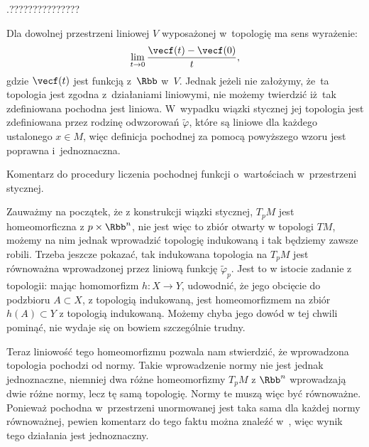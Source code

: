 \documentclass[a4paper,11pt]{article}
\numberwithin{equation}{section}
\begin{document}
\vspace{\spaceFour}





\noindent
{} .???????????????

\vspace{\spaceFour}





\noindent
{} Dla dowolnej przestrzeni liniowej $V$ wyposażonej w~topologię
ma sens wyrażenie:
\begin{equation}
  \label{eq:GancarzewiczZWGR-s01-02}
  \lim\limits_{ t \to 0 } \frac{ \vecf( t ) - \vecf( 0 ) }{ t },
\end{equation}
gdzie $\vecf( t )$ jest funkcją z~$\Rbb$ w~$V$. Jednak jeżeli
nie założymy, że~ta topologia jest zgodna z~działaniami liniowymi, nie
możemy twierdzić iż~tak zdefiniowana pochodna jest liniowa. W~wypadku
wiązki stycznej jej topologia jest zdefiniowana przez rodzinę
odwzorowań $\widetilde{ \varphi }$, które są liniowe dla każdego
ustalonego $x \in M$, więc definicja pochodnej za pomocą powyższego
wzoru jest poprawna i~jednoznaczna.

\vspace{\spaceFour}





\noindent
Komentarz do procedury liczenia pochodnej funkcji o~wartościach
w~przestrzeni stycznej.

Zauważmy na początek, że z konstrukcji wiązki stycznej, $T_{ p }M$
jest homeomorficzna z $p \times \Rbb^{ n }$, nie jest więc to
zbiór otwarty w topologi $TM$, możemy na nim jednak wprowadzić
topologię indukowaną i tak będziemy zawsze robili. Trzeba jeszcze
pokazać, tak indukowana topologia na $T_{ p }M$ jest równoważna
wprowadzonej przez liniową funkcję $\widetilde{ \varphi }_{ p }$. Jest
to w istocie zadanie z topologii: mając homomorfizm $h : X \to Y$,
udowodnić, że jego obcięcie do podzbioru $A \subset X$, z topologią indukowaną,
jest homeomorfizmem na zbiór $h( A ) \subset Y$ z topologią indukowaną. Możemy
chyba jego dowód w tej chwili pominąć, nie wydaje się on bowiem
szczególnie trudny.

Teraz liniowość tego homeomorfizmu pozwala nam stwierdzić, że
wprowadzona topologia pochodzi od normy. Takie wprowadzenie normy nie
jest jednak jednoznaczne, niemniej dwa różne homeomorfizmy $T_{ p }M$
z $\Rbb^{ n }$ wprowadzają dwie różne normy, lecz tę samą
topologię. Normy te muszą więc być równoważne. Ponieważ pochodna w~przestrzeni unormowanej jest taka sama dla każdej normy równoważnej,
pewien komentarz do tego faktu można znaleźć
w~\cite{SchwartzKursAnalizyMatematycznejVolI1979}, więc
wynik tego działania jest jednoznaczny.
\end{document}
